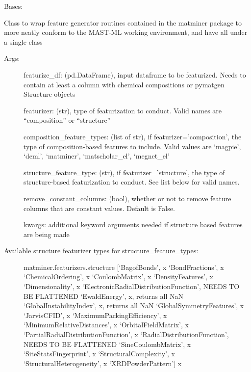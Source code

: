 \documentclass[letterpaper,10pt,english]{sphinxmanual}
\begin{document}
\begin{fulllineitems}
\label{\detokenize{api/mastml.feature_generators.MatminerFeatureGenerator:mastml.feature_generators.MatminerFeatureGenerator}}
Bases: {\hyperref[\detokenize{api/mastml.feature_generators.BaseGenerator:mastml.feature_generators.BaseGenerator}]{}}

Class to wrap feature generator routines contained in the matminer package to more neatly conform to the
MAST-ML working environment, and have all under a single class
\begin{description}
\item[{Args:}] \leavevmode
featurize\_df: (pd.DataFrame), input dataframe to be featurized. Needs to contain at least a column with chemical compositions or pymatgen Structure objects

featurizer: (str), type of featurization to conduct. Valid names are “composition” or “structure”

composition\_feature\_types: (list of str), if featurizer=’composition’, the type of composition-based features to include. Valid values are ‘magpie’, ‘deml’, ‘matminer’, ‘matscholar\_el’, ‘megnet\_el’

structure\_feature\_type: (str), if featurizer=’structure’, the type of structure-based featurization to conduct. See list below for valid names.

remove\_constant\_columns: (bool), whether or not to remove feature columns that are constant values. Default is False.

kwargs: additional keyword arguments needed if structure based features are being made

\item[{Available structure featurizer types for structure\_feature\_types:}] \leavevmode
matminer.featurizers.structure
{[}‘BagofBonds’, x
‘BondFractions’, x
‘ChemicalOrdering’, x
‘CoulombMatrix’, x
‘DensityFeatures’, x
‘Dimensionality’, x
‘ElectronicRadialDistributionFunction’, NEEDS TO BE FLATTENED
‘EwaldEnergy’, x, returns all NaN
‘GlobalInstabilityIndex’, x, returns all NaN
‘GlobalSymmetryFeatures’, x
‘JarvisCFID’, x
‘MaximumPackingEfficiency’, x
‘MinimumRelativeDistances’, x
‘OrbitalFieldMatrix’, x
‘PartialRadialDistributionFunction’, x
‘RadialDistributionFunction’, NEEDS TO BE FLATTENED
‘SineCoulombMatrix’, x
‘SiteStatsFingerprint’, x
‘StructuralComplexity’, x
‘StructuralHeterogeneity’, x
‘XRDPowderPattern’{]} x


\end{description}
\end{fulllineitems}
\end{document}
